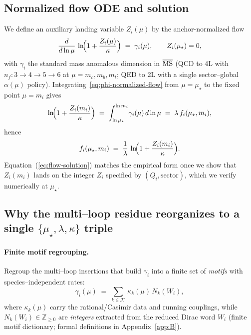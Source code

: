 \documentclass[aps,prd,onecolumn,amsmath,amssymb,superscriptaddress,nofootinbib,showpacs,showkeys]{revtex4-2}
\begin{document}
\subsection{Normalized flow ODE and solution}
We define an auxiliary landing variable $Z_i(\mu)$ by the anchor-normalized flow
\begin{equation}
  \frac{d}{d\ln\mu}\,
  \ln\!\Bigl(1+\frac{Z_i(\mu)}{\kappa}\Bigr)
  \;=\;
  \gamma_i(\mu),
  \qquad
  Z_i(\mu_\star)=0,
  \label{eq:phi-normalized-flow}
\end{equation}
with $\gamma_i$ the standard mass anomalous dimension in $\overline{\rm MS}$ (QCD to 4L with $n_f:3\!\to\!4\!\to\!5\!\to\!6$ at $\mu=m_c,m_b,m_t$; QED to 2L with a single sector--global $\alpha(\mu)$ policy).  Integrating~\ref{eq:phi-normalized-flow} from $\mu=\mu_\star$ to the fixed point $\mu=m_i$ gives
\begin{equation}
  \ln\!\Bigl(1+\frac{Z_i(m_i)}{\kappa}\Bigr)
  \;=\;\int_{\ln\mu_\star}^{\ln m_i}\!\gamma_i(\mu)\,d\ln\mu
  \;=\;\lambda\,f_i(\mu_\star,m_i),
\end{equation}
hence
\begin{equation}
  f_i(\mu_\star,m_i)
  \;=\;\frac{1}{\lambda}\,
  \ln\!\Bigl(1+\frac{Z_i(m_i)}{\kappa}\Bigr).
  \label{eq:flow-solution}
\end{equation}
Equation~(\ref{eq:flow-solution}) matches the empirical form once we show that $Z_i(m_i)$ lands on the integer $Z_i$ specified by $(Q_i,\text{sector})$, which we verify numerically at $\mu_\star$.










\subsection{Why the multi--loop residue reorganizes to a single \texorpdfstring{$\{\mu_\star,\lambda,\kappa\}$}{\{mu*,lambda,kappa\}} triple}
\label{subsec:why-reorganizes}

\paragraph{Finite motif regrouping.}
Regroup the multi--loop insertions that build $\gamma_i$ into a finite set of \emph{motifs} with species--independent rates:
\begin{equation}
  \gamma_i(\mu)
  \;=\;
  \sum_{k\in\mathcal K}\,\kappa_k(\mu)\,N_k(W_i),
  \label{eq:motif-decomp}
\end{equation}
where $\kappa_k(\mu)$ carry the rational/Casimir data and running couplings, while $N_k(W_i)\in\mathbb Z_{\ge0}$ are \emph{integers} extracted from the reduced Dirac word $W_i$ (finite motif dictionary; formal definitions in Appendix~\ref{app:B}).
\end{document}
